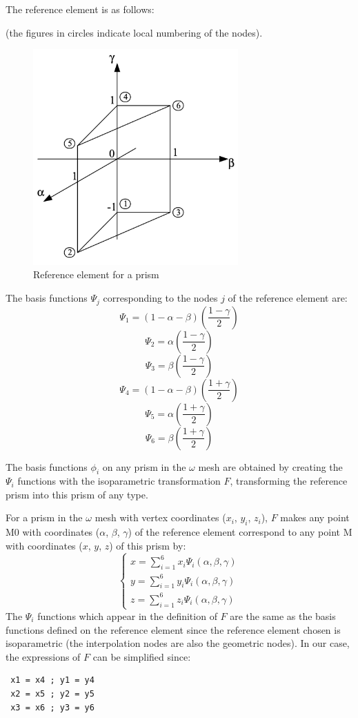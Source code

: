 The reference element is as follows:

(the figures in circles indicate local numbering of the nodes).

\begin{figure}[H]%
\begin{center}
%
  \includegraphics[width=0.7\textwidth]{./graphics/prism}
%
\end{center}
\caption{Reference element for a prism}
\label{fig:prism}
\end{figure}

The basis functions $\Psi _{j}$ corresponding to the nodes $j$ of the reference
element are:
\[\Psi _{1} =(1-\alpha -\beta )\left(\frac{1-\gamma }{2} \right)\]
\[\Psi _{2} =\alpha \left(\frac{1-\gamma }{2} \right)\]
\[\Psi _{3} =\beta \left(\frac{1-\gamma }{2} \right)\]
\[\Psi _{4} =(1-\alpha -\beta )\left(\frac{1+\gamma }{2} \right)\]
\[\Psi _{5} =\alpha \left(\frac{1+\gamma }{2} \right)\]
\[\Psi _{6} =\beta \left(\frac{1+\gamma }{2} \right)\]

The basis functions $\phi _{i}$ on any prism in the $\omega$ mesh are obtained
by creating the $\Psi _{i}$ functions with the isoparametric transformation $F$,
transforming the reference prism into this prism of any type.

For a prism in the $\omega$ mesh with vertex coordinates ($x_i$, $y_i$, $z_i$),
$F$ makes any point M0 with coordinates ($\alpha$, $\beta$, $\gamma$) of the
reference element correspond to any point M with coordinates ($x$, $y$, $z$) of
this prism by:
\[\left\{\begin{array}{c} {x=\sum _{i=1}^{6}x_{i} \Psi _{i} (\alpha ,\beta
  ,\gamma ) } \\ {y=\sum _{i=1}^{6}y_{i} \Psi _{i} (\alpha ,\beta ,\gamma ) }
  \\ {z=\sum _{i=1}^{6}z_{i} \Psi _{i} (\alpha ,\beta ,\gamma ) }
  \end{array}\right. \]
The $\Psi_i$ functions which appear in the definition of $F$ are the same as
the basis functions defined on the reference element since the reference
element chosen is isoparametric (the interpolation nodes are also the geometric
nodes). In our case, the expressions of $F$ can be simplified since:
\begin{verbatim}
 x1 = x4 ; y1 = y4
 x2 = x5 ; y2 = y5
 x3 = x6 ; y3 = y6
\end{verbatim}

